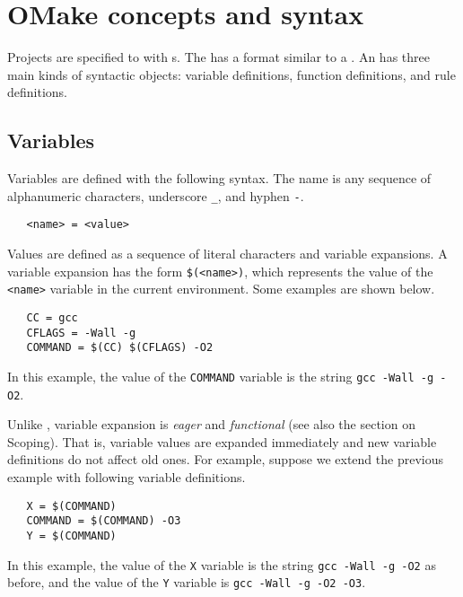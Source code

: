 %
\chapter{OMake concepts and syntax}
\label{chapter:language}

Projects are specified to  with s.  The  has a format
similar to a .  An  has three main kinds of syntactic objects:
variable definitions, function definitions, and rule definitions.

\section{Variables}
\label{section:variables}

Variables are defined with the following syntax.  The name is any sequence of alphanumeric
characters, underscore \verb+_+, and hyphen \verb+-+.

\begin{verbatim}
   <name> = <value>
\end{verbatim}

Values are defined as a sequence of literal characters and variable expansions.  A variable
expansion has the form \verb+$(<name>)+, which represents the value of the \verb+<name>+
variable in the current environment.  Some examples are shown below.

\begin{verbatim}
   CC = gcc
   CFLAGS = -Wall -g
   COMMAND = $(CC) $(CFLAGS) -O2
\end{verbatim}

In this example, the value of the \verb+COMMAND+ variable is the string \verb+gcc -Wall -g -O2+.

Unlike , variable expansion is \emph{eager} and \emph{functional} (see also the section
on Scoping).  That is, variable values are expanded immediately and new variable definitions do not
affect old ones.  For example, suppose we extend the previous example with following variable
definitions.

\begin{verbatim}
   X = $(COMMAND)
   COMMAND = $(COMMAND) -O3
   Y = $(COMMAND)
\end{verbatim}

In this example, the value of the \verb+X+ variable is the string \verb+gcc -Wall -g -O2+ as
before, and the value of the \verb+Y+ variable is \verb+gcc -Wall -g -O2 -O3+.

